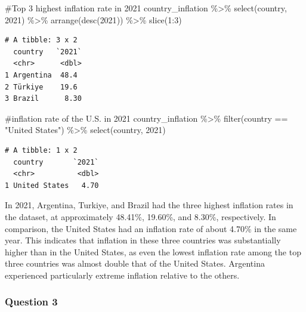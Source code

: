 \documentclass[
  letterpaper,
  DIV=11,
  numbers=noendperiod]{scrartcl}
\newenvironment{Shaded}{\begin{snugshade}}{\end{snugshade}}
\newcommand{\AttributeTok}[1]{\textcolor[rgb]{0.40,0.45,0.13}{#1}}
\newcommand{\CommentTok}[1]{\textcolor[rgb]{0.37,0.37,0.37}{#1}}
\newcommand{\DecValTok}[1]{\textcolor[rgb]{0.68,0.00,0.00}{#1}}
\newcommand{\FunctionTok}[1]{\textcolor[rgb]{0.28,0.35,0.67}{#1}}
\newcommand{\NormalTok}[1]{\textcolor[rgb]{0.00,0.23,0.31}{#1}}
\newcommand{\SpecialCharTok}[1]{\textcolor[rgb]{0.37,0.37,0.37}{#1}}
\newcommand{\StringTok}[1]{\textcolor[rgb]{0.13,0.47,0.30}{#1}}
\begin{document}
\begin{Shaded}
\begin{Highlighting}[]
\CommentTok{\#Top 3 highest inflation rate in 2021}
\NormalTok{country\_inflation }\SpecialCharTok{\%\textgreater{}\%}
  \FunctionTok{select}\NormalTok{(country, }\StringTok{\textasciigrave{}}\AttributeTok{2021}\StringTok{\textasciigrave{}}\NormalTok{) }\SpecialCharTok{\%\textgreater{}\%}
  \FunctionTok{arrange}\NormalTok{(}\FunctionTok{desc}\NormalTok{(}\StringTok{\textasciigrave{}}\AttributeTok{2021}\StringTok{\textasciigrave{}}\NormalTok{)) }\SpecialCharTok{\%\textgreater{}\%}
  \FunctionTok{slice}\NormalTok{(}\DecValTok{1}\SpecialCharTok{:}\DecValTok{3}\NormalTok{)}
\end{Highlighting}
\end{Shaded}

\begin{verbatim}
# A tibble: 3 x 2
  country   `2021`
  <chr>      <dbl>
1 Argentina  48.4 
2 Türkiye    19.6 
3 Brazil      8.30
\end{verbatim}

\begin{Shaded}
\begin{Highlighting}[]
\CommentTok{\#inflation rate of the U.S. in 2021}
\NormalTok{country\_inflation }\SpecialCharTok{\%\textgreater{}\%}
  \FunctionTok{filter}\NormalTok{(country }\SpecialCharTok{==} \StringTok{"United States"}\NormalTok{) }\SpecialCharTok{\%\textgreater{}\%}
  \FunctionTok{select}\NormalTok{(country, }\StringTok{\textasciigrave{}}\AttributeTok{2021}\StringTok{\textasciigrave{}}\NormalTok{)}
\end{Highlighting}
\end{Shaded}

\begin{verbatim}
# A tibble: 1 x 2
  country       `2021`
  <chr>          <dbl>
1 United States   4.70
\end{verbatim}

In 2021, Argentina, Turkiye, and Brazil had the three highest inflation
rates in the dataset, at approximately 48.41\%, 19.60\%, and 8.30\%,
respectively. In comparison, the United States had an inflation rate of
about 4.70\% in the same year. This indicates that inflation in these
three countries was substantially higher than in the United States, as
even the lowest inflation rate among the top three countries was almost
double that of the United States. Argentina experienced particularly
extreme inflation relative to the others.

\subsubsection{Question 3}\label{question-3}
\end{document}
